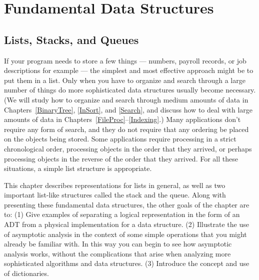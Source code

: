 
\part{Fundamental Data Structures}
\label{Core}
\mycleardoublepage

\chapter{Lists, Stacks, and Queues}
\label{LSQ}
\def\CHHEAD{Chap.\ \thechapter\ Lists, Stacks, and Queues}    %


If your program needs to store a few things --- numbers,
payroll records, or job descriptions for example --- the simplest and
most effective approach might be to put them in a list.
Only when you have to organize and search through a large number of
things do more sophisticated data structures usually become necessary.
(We will study how to organize and search through medium amounts of
data in Chapters~\ref{BinaryTree}, \ref{InSort}, and \ref{Search},
and discuss how to deal with large amounts of data in
Chapters~\ref{FileProc}--\ref{Indexing}.)
Many applications don't require any form of search,
and they do not require that any ordering be placed on the objects
being stored.
Some applications require processing in a strict chronological order,
processing objects in the order that they arrived,
or perhaps processing objects in the reverse of the order that they
arrived.
For all these situations, a simple list structure is appropriate.

This chapter describes representations for lists in general,
as well as two important list-like structures called
the stack and the queue.
Along with presenting these fundamental data structures, the other
goals of the chapter are to:
(1) Give examples of separating a logical representation in the
form of an ADT
from a physical implementation for a data structure.
(2) Illustrate the use of asymptotic analysis in the context of
some simple operations that you might already be familiar with.
In this way you can begin to see how asymptotic
analysis works,
without the complications that arise when analyzing more sophisticated
algorithms and data structures.
(3) Introduce the concept and use of dictionaries.

